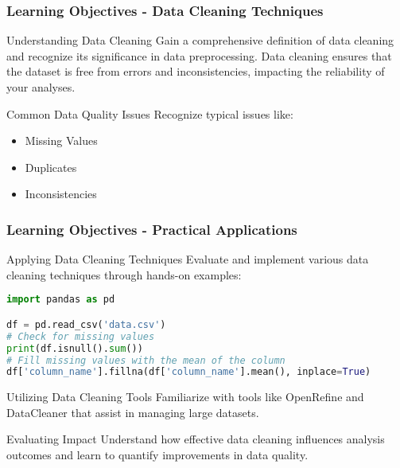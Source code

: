\documentclass[aspectratio=169]{beamer}
\begin{document}
\begin{frame}[fragile]
    \frametitle{Learning Objectives - Data Cleaning Techniques}
    \begin{block}{Understanding Data Cleaning}
        Gain a comprehensive definition of data cleaning and recognize its significance in data preprocessing. Data cleaning ensures that the dataset is free from errors and inconsistencies, impacting the reliability of your analyses.
    \end{block}

    \begin{block}{Common Data Quality Issues}
        Recognize typical issues like:
        \begin{itemize}
            \item Missing Values
            \item Duplicates
            \item Inconsistencies
        \end{itemize}
    \end{block}
\end{frame}

\begin{frame}[fragile]
    \frametitle{Learning Objectives - Practical Applications}
    \begin{block}{Applying Data Cleaning Techniques}
        Evaluate and implement various data cleaning techniques through hands-on examples:
        \begin{lstlisting}[language=Python]
import pandas as pd

df = pd.read_csv('data.csv')
# Check for missing values
print(df.isnull().sum())
# Fill missing values with the mean of the column
df['column_name'].fillna(df['column_name'].mean(), inplace=True)
        \end{lstlisting}
    \end{block}

    \begin{block}{Utilizing Data Cleaning Tools}
        Familiarize with tools like OpenRefine and DataCleaner that assist in managing large datasets.
    \end{block}
    
    \begin{block}{Evaluating Impact}
        Understand how effective data cleaning influences analysis outcomes and learn to quantify improvements in data quality.
    \end{block}
\end{frame}
\end{document}
